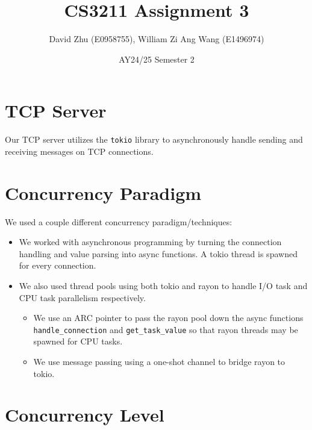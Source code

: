 \documentclass[11pt]{article}
\title{CS3211 Assignment 3}
\author{David Zhu (E0958755), William Zi Ang Wang (E1496974)}
\date{AY24/25 Semester 2}
\begin{document}
\maketitle


\section{TCP Server}

Our TCP server utilizes the \texttt{tokio} library to asynchronously handle sending and receiving
messages on TCP connections.

\section{Concurrency Paradigm}

We used a couple different concurrency paradigm/techniques:
\begin{itemize}
    \item We worked with asynchronous programming by turning the connection handling and value parsing into async functions. A tokio thread is spawned for every connection.
    \item We also used thread pools using both tokio and rayon to handle I/O task and CPU task parallelism
        respectively.
        \begin{itemize}
    \item We use an ARC pointer to pass the rayon pool down the async functions
        \texttt{handle\_connection} and \texttt{get\_task\_value} so that rayon threads may be spawned for CPU tasks.
    \item We use message passing using a one-shot channel to bridge rayon to tokio.
        \end{itemize}
\end{itemize}


\section{Concurrency Level}
\end{document}
